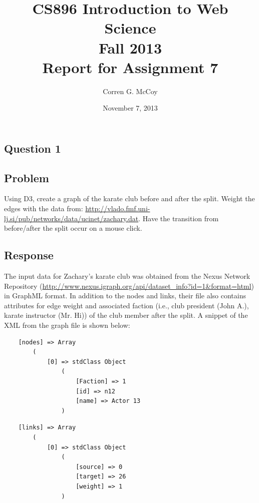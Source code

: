 \documentclass[letterpaper,11pt]{report}
\begin{document}
 
\begin{savenotes}
\pagestyle{plain}
\title{CS896 Introduction to Web Science\\Fall 2013\\Report for Assignment 7}
\author{Corren G. McCoy}
 
\date{November 7, 2013}
\maketitle

\renewcommand*\thesection{\arabic{section}}
\setcounter{section}{0}

\setcounter{tocdepth}{4}
\tableofcontents
 \listoffigures
\newpage


\section{Question 1}
\subsection{Problem}Using D3, create a graph of the karate club before and after the split. Weight the edges with the data from:  \url{http://vlado.fmf.uni-lj.si/pub/networks/data/ucinet/zachary.dat}. Have the transition from before/after the split occur on a mouse click.

\subsection{Response}The input data for Zachary's karate club was obtained from the Nexus Network Repository (\url{http://www.nexus.igraph.org/api/dataset_info?id=1&format=html}) in GraphML format. In addition to the nodes and links, their file also contains attributes for edge weight and associated faction (i.e., club president (John A.), karate instructor (Mr. Hi)) of the club member after the split. A snippet of the XML from the graph file is shown below:

\begin{verbatim}
    [nodes] => Array
        (
            [0] => stdClass Object
                (
                    [Faction] => 1
                    [id] => n12
                    [name] => Actor 13
                )
\end{verbatim} 
\begin{verbatim}
    [links] => Array
        (
            [0] => stdClass Object
                (
                    [source] => 0
                    [target] => 26
                    [weight] => 1
                )
\end{verbatim}


\end{savenotes}
\end{document}
